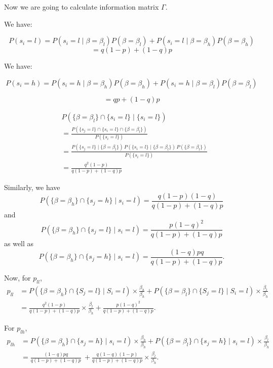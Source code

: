 \documentclass[12pt]{article}
\begin{document}
Now we are going to calculate information matrix $\Gamma$.

We have:

\[
P(s_i = l) = P(s_i = l \mid \beta = \beta_l)P(\beta = \beta_l) + P(s_i = l \mid \beta = \beta_h) P(\beta = \beta_h)
\]
\[
=q(1-p)+(1-q)p
\]

We have:

\[
P(s_i = h) = P(s_i = h \mid \beta = \beta_h)P(\beta = \beta_h) + P(s_i = h \mid \beta = \beta_l) P(\beta = \beta_l)
\]


\[
= qp+(1-q)p
\]



\begin{align*}
&P(\{ \beta = \beta_l\} \cap \{ s_i= l \} \mid \{ s_i = l \}) \\
&= \frac{P(\{ s_j = l \} \cap \{ s_i = l \} \cap \{ \beta = \beta_l \})}{P(\{ s_i = l \})} \\
&= \frac{P(\{ s_j = l \} \mid \{ \beta = \beta_l \}) \, P(\{ s_i = l \} \mid \{ \beta = \beta_l \}) \, P(\{ \beta = \beta_l\})}{P(\{ s_i = l \})} \\
&= \frac{q^2(1-p)}{q(1-p)+ (1 - q)p}
\end{align*}

Similarly, we have
\[
P(\{\beta = \beta_h\} \cap \{s_j = h\} \mid s_i = l) = \frac{q(1-p)(1-q)}{q(1-p) + (1-q)p}
\]
and
\[
P(\{\beta = \beta_h\} \cap \{s_j = l\} \mid s_i = l) = \frac{p(1-q)^2}{q(1-p) + (1-q)p}
\]
as well as
\[
P(\{\beta = \beta_h\} \cap \{s_j = h\} \mid s_i = l) = \frac{(1-q)pq}{q(1-p) + (1-q)p}.
\]

Now, for \( p_{ll} \),
\begin{align*}
p_{ll} &= P\left( \{\beta = \beta_h\} \cap \{S_j = l\} \mid S_i = l \right) \times \frac{\beta_h}{\beta_h}
+ P\left( \{\beta = \beta_l\} \cap \{S_j = l\} \mid S_i = l \right) \times \frac{\beta_l}{\beta_h} \\
&= \frac{q^2(1-p)} {q(1-p)+(1-q)p}\times \frac{\beta_l}{\beta_h}
+ \frac{p(1-q)^2}{q(1-p)+(1-q)p}.
\end{align*}

For \( p_{lh} \),
\begin{align*}
p_{lh} &= P\left( \{\beta = \beta_h\} \cap \{s_j = h\} \mid s_i = l \right) \times \frac{\beta_h}{\beta_h}
+ P\left( \{\beta = \beta_l\} \cap \{s_j = h\} \mid s_i = l \right) \times \frac{\beta_l}{\beta_h}\\
&= \frac{(1-q)pq}{q(1-p) + (1-q)p}\
+ \frac{q(1-q)(1-p)}{q(1-p) + (1-q)p} \times \frac{\beta_l}{\beta_h}.
\end{align*}
\end{document}
